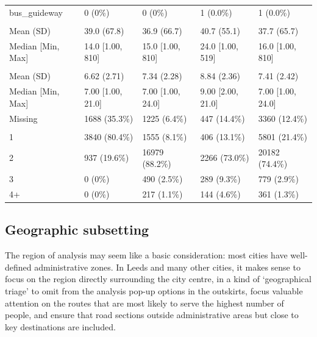 \documentclass[
]{article}
\begin{document}
\begin{table}
\begin{tabular}[t]{lllll}
\hspace{1em}bus\_guideway & 0 (0\%) & 0 (0\%) & 1 (0.0\%) & 1 (0.0\%)\\
\addlinespace[0.3em]
\multicolumn{5}{l}{\textbf{Cycling potential}}\\
\hspace{1em}Mean (SD) & 39.0 (67.8) & 36.9 (66.7) & 40.7 (55.1) & 37.7 (65.7)\\
\hspace{1em}Median [Min, Max] & 14.0 [1.00, 810] & 15.0 [1.00, 810] & 24.0 [1.00, 519] & 16.0 [1.00, 810]\\
\addlinespace[0.3em]
\multicolumn{5}{l}{\textbf{Width (m)}}\\
\hspace{1em}Mean (SD) & 6.62 (2.71) & 7.34 (2.28) & 8.84 (2.36) & 7.41 (2.42)\\
\hspace{1em}Median [Min, Max] & 7.00 [1.00, 21.0] & 7.00 [1.00, 24.0] & 9.00 [2.00, 21.0] & 7.00 [1.00, 24.0]\\
\hspace{1em}Missing & 1688 (35.3\%) & 1225 (6.4\%) & 447 (14.4\%) & 3360 (12.4\%)\\
\addlinespace[0.3em]
\multicolumn{5}{l}{\textbf{N. lanes}}\\
\hspace{1em}1 & 3840 (80.4\%) & 1555 (8.1\%) & 406 (13.1\%) & 5801 (21.4\%)\\
\hspace{1em}2 & 937 (19.6\%) & 16979 (88.2\%) & 2266 (73.0\%) & 20182 (74.4\%)\\
\hspace{1em}3 & 0 (0\%) & 490 (2.5\%) & 289 (9.3\%) & 779 (2.9\%)\\
\hspace{1em}4+ & 0 (0\%) & 217 (1.1\%) & 144 (4.6\%) & 361 (1.3\%)\\
\bottomrule
\end{tabular}
\end{table}

\hypertarget{geographic-subsetting}{%
\subsection{Geographic subsetting}\label{geographic-subsetting}}

The region of analysis may seem like a basic consideration: most cities have well-defined administrative zones.
In Leeds and many other cities, it makes sense to focus on the region directly surrounding the city centre, in a kind of `geographical triage' to omit from the analysis pop-up options in the outskirts, focus valuable attention on the routes that are most likely to serve the highest number of people, and ensure that road sections outside administrative areas but close to key destinations are included.
\end{document}
